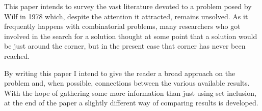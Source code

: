 This paper intends to survey the vast literature devoted to a problem posed by Wilf in 1978 which, despite the attention it attracted, remains unsolved. As it frequently happens with combinatorial problems, many researchers who got involved in the search for a solution thought at some point that a solution would be just around the corner, but in the present case that corner has never been reached.

By writing this paper I intend to give the reader a broad approach on the problem and, when possible, connections between the various available results. With the hope of gathering some more information than just using set inclusion, at the end of the paper a slightly different way of comparing results is developed.

